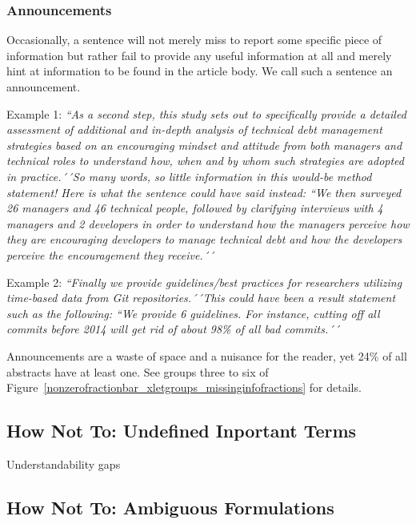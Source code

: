 \documentclass[10pt,journal,compsoc]{IEEEtran}
\newcommand{\Quote}[1]{\bgroup\itshape ``#1´´\egroup}
\newcommand{\Pseudoquote}[1]{\bgroup\itshape ``#1´´\egroup}
\begin{document}
\subsubsection{Announcements}

Occasionally, a sentence will not merely miss to report some specific piece of information
but rather fail to provide any useful information at all and merely hint at
information to be found in the article body.
We call such a sentence an announcement.

Example 1:
\Quote{As a second step, this study sets out to specifically
  provide a detailed assessment of additional and in-depth analysis of technical debt management strategies based
  on an encouraging mindset and attitude from both managers and technical roles to understand how, when and by
  whom such strategies are adopted in practice.} [BesMarBos22]
So many words, so little information in this would-be method statement!
Here is what the sentence could have said instead:
\Pseudoquote{We then surveyed 26 managers and 46 technical people, followed by clarifying interviews 
  with 4 managers and 2 developers in order to understand how the managers perceive how they are encouraging
  developers to manage technical debt and how the developers perceive the encouragement they receive.}

Example 2:
\Quote{Finally we provide guidelines/best practices for researchers utilizing time-based data
from Git repositories.} [FliChaDye22]  %
This could have been a result statement such as the following:
\Pseudoquote{We provide 6 guidelines. For instance, cutting off all commits before 2014
  will get rid of about 98\% of all bad commits.}

Announcements are a waste of space and a nuisance for the reader, 
yet 24\% of all abstracts have at least one.
See groups three to six of Figure~\ref{nonzerofractionbar_xletgroups_missinginfofractions} 
for details.


\subsection{How Not To: Undefined Inportant Terms}

Understandability gaps


\subsection{How Not To: Ambiguous Formulations}
\end{document}

